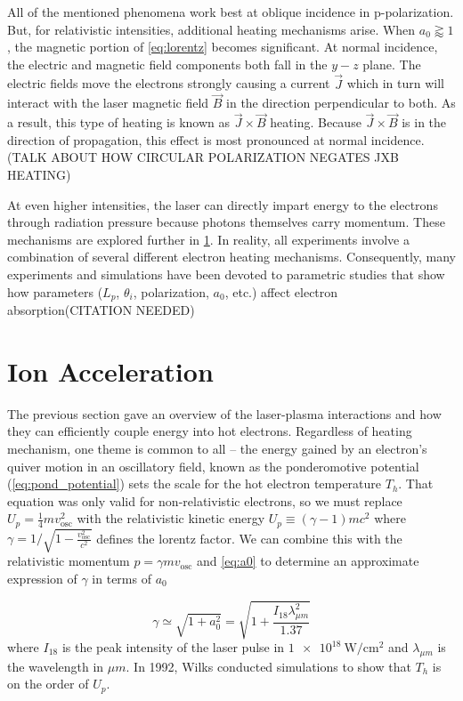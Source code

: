 All of the mentioned phenomena work best at oblique incidence in p-polarization. But, for relativistic intensities, additional heating mechanisms arise. When $a_0 \gtrapprox 1$, the magnetic portion of \cref{eq:lorentz} becomes significant. At normal incidence, the electric and magnetic field components both fall in the $y-z$ plane. The electric fields move the electrons strongly causing a current $\vec{J}$ which in turn will interact with the laser magnetic field $\vec{B}$ in the direction perpendicular to both. As a result, this type of heating is known as $\vec{J} \times \vec{B}$ heating\cite{Gibbon_2005_Plasma,Kruer_1985_PoF}. Because $\vec{J} \times \vec{B}$ is in the direction of propagation, this effect is most pronounced at normal incidence. (TALK ABOUT HOW CIRCULAR POLARIZATION NEGATES JXB HEATING)

At even higher intensities, the laser can directly impart energy to the electrons through radiation pressure\cite{Macchi_2013_RevModPhys} because photons themselves carry momentum. These mechanisms are explored further in \cref{sec:acceleration}. In reality, all experiments involve a combination of several different electron heating mechanisms. Consequently, many experiments and simulations have been devoted to parametric studies that show how parameters ($L_p$, $\theta_i$, polarization, $a_0$, etc.) affect electron absorption(CITATION NEEDED)

\section{Ion Acceleration} \label{sec:acceleration}

The previous section gave an overview of the laser-plasma interactions and how they can efficiently couple energy into hot electrons. Regardless of heating mechanism, one theme is common to all -- the energy gained by an electron's quiver motion in an oscillatory field, known as the ponderomotive potential (\cref{eq:pond_potential}) sets the scale for the hot electron temperature $T_h$. That equation was only valid for non-relativistic electrons, so we must replace $U_p = \frac{1}{4} m v_\text{osc}^2$ with the relativistic kinetic energy $U_p \equiv (\gamma - 1) m c^2$ where $\gamma = 1 / \sqrt{1 - \frac{v_\text{osc}^2}{c^2}}$ defines the lorentz factor. We can combine this with the relativistic momentum $p = \gamma m v_\text{osc}$ and \cref{eq:a0} to determine an approximate expression of $\gamma$ in terms of $a_0$
	
\begin{equation}
	\gamma \simeq \sqrt{1 + a_0^2} = \sqrt{1 + \frac{I_{18} \lambda_{\mu m}^2}{1.37}} \label{eq:gamma}
\end{equation}
where $I_{18}$ is the peak intensity of the laser pulse in $\SI{1e18}{\watt \per \centi \meter \squared}$ and $\lambda_{\mu m}$ is the wavelength in $\mu m$. In 1992, Wilks\cite{Wilks_1992_PRL} conducted simulations to show that $T_h$ is on the order of $U_p$. 

